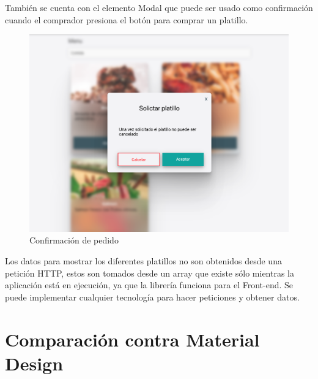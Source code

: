 También se cuenta con el elemento Modal que puede ser usado como confirmación cuando el comprador presiona el botón para comprar un platillo.
\newline
\begin{figure}[H]
    \includegraphics[width=1\textwidth]{./Imagenes/9.15.png}
   \centering 
    \caption[Confirmación de pedido]{Confirmación de pedido}
    \end{figure}
\newline

Los datos para mostrar los diferentes platillos no son obtenidos desde una petición HTTP, estos son tomados desde un array que existe sólo mientras la aplicación está en ejecución, ya que la librería funciona para el Front-end.  Se puede implementar cualquier tecnología para hacer peticiones y obtener datos.

\section{Comparación contra Material Design}


